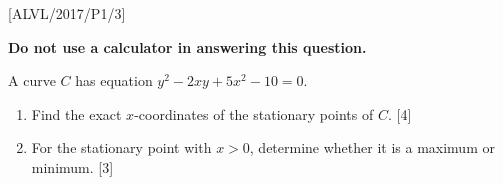 \item {[}ALVL/2017/P1/3{]}

\textbf{Do not use a calculator in answering this question.} 

A curve $C$ has equation $y^{2}-2xy+5x^{2}-10=0$. 
\begin{enumerate}
\item Find the exact $x$-coordinates of the stationary points of $C$.
\hfill{}{[}4{]}
\item For the stationary point with $x>0$, determine whether it is a maximum
or minimum. \hfill{}{[}3{]}
\end{enumerate}
